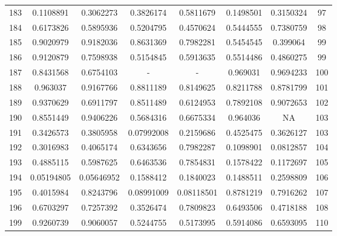 \begin{anexosenv}
{\begin{longtable}{cccccccc}
183 & 0.1108891 & 0.3062273 & 0.3826174 & 0.5811679 & 0.1498501 & 0.3150324 & 97 \\ 
184 & 0.6173826 & 0.5895936 & 0.5204795 & 0.4570624 & 0.5444555 & 0.7380759 & 98 \\ 
185 & 0.9020979 & 0.9182036 & 0.8631369 & 0.7982281 & 0.5454545 & 0.399064 & 99 \\ 
186 & 0.9120879 & 0.7598938 & 0.5154845 & 0.5913635 & 0.5514486 & 0.4860275 & 99 \\ 
187 & 0.8431568 & 0.6754103 & - & - &  0.969031 & 0.9694233 & 100 \\ 
188 & 0.963037 & 0.9167766 & 0.8811189 & 0.8149625 & 0.8211788 & 0.8781799 & 101 \\ 
189 & 0.9370629 & 0.6911797 & 0.8511489 & 0.6124953 & 0.7892108 & 0.9072653 & 102 \\ 
190 & 0.8551449 & 0.9406226 & 0.5684316 & 0.6675334 & 0.964036 & NA & 103 \\ 
191 & 0.3426573 & 0.3805958 & 0.07992008 & 0.2159686 & 0.4525475 & 0.3626127 & 103 \\ 
192 & 0.3016983 & 0.4065174 & 0.6343656 & 0.7982287 & 0.1098901 & 0.0812857 & 104 \\ 
193 & 0.4885115 & 0.5987625 & 0.6463536 & 0.7854831 & 0.1578422 & 0.1172697 & 105 \\ 
194 & 0.05194805 & 0.05646952 & 0.1588412 & 0.1840023 & 0.1488511 & 0.2598809 & 106 \\ 
195 & 0.4015984 & 0.8243796 & 0.08991009 & 0.08118501 & 0.8781219 & 0.7916262 & 107 \\ 
196 & 0.6703297 & 0.7257392 & 0.3526474 & 0.7809823 & 0.6493506 & 0.4718188 & 108 \\ 
199 & 0.9260739 & 0.9060057 & 0.5244755 & 0.5173995 & 0.5914086 & 0.6593095 & 110 \\ 
\end{longtable}
}




\end{anexosenv}
